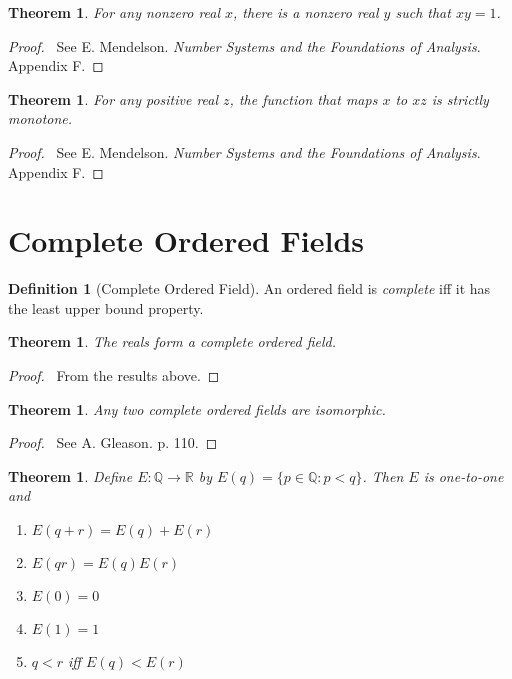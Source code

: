 \documentclass{article}
\let\qed\relax
\newtheorem{theorem}[axiom]{Theorem}
\theoremstyle{definition}
\newtheorem{definition}[axiom]{Definition}
\begin{document}
    \begin{theorem}
        For any nonzero real $x$, there is a nonzero real $y$ such that $xy = 1$.
    \end{theorem}

    \begin{proof}
        \pf\ See E. Mendelson. \emph{Number Systems and the Foundations of Analysis}. Appendix F. \qed
    \end{proof}

    \begin{theorem}
        For any positive real $z$, the function that maps $x$ to $xz$ is strictly monotone.
    \end{theorem}

    \begin{proof}
        \pf\ See E. Mendelson. \emph{Number Systems and the Foundations of Analysis}. Appendix F. \qed
    \end{proof}

    \section{Complete Ordered Fields}

    \begin{definition}[Complete Ordered Field]
        An ordered field is \emph{complete} iff it has the least upper bound property.
    \end{definition}

    \begin{theorem}
        The reals form a complete ordered field.
    \end{theorem}

    \begin{proof}
        \pf\ From the results above. \qed
    \end{proof}

    \begin{theorem}
        Any two complete ordered fields are isomorphic.
    \end{theorem}

    \begin{proof}
        \pf\ See A. Gleason.  p. 110. \qed
    \end{proof}

    \begin{theorem}
        Define $E : \mathbb{Q} \rightarrow \mathbb{R}$ by $E(q) = \{ p \in \mathbb{Q} : p < q \}$.
        Then $E$ is one-to-one and
        \begin{enumerate}
            \item $E(q+r) = E(q) + E(r)$
            \item $E(qr) = E(q) E(r)$
            \item $E(0) = 0$
            \item $E(1) = 1$
            \item $q < r$ iff $E(q) < E(r)$
        \end{enumerate}
    \end{theorem}
\end{document}
